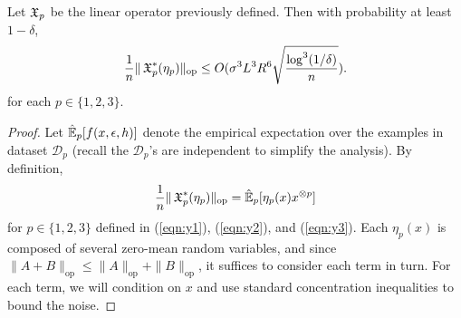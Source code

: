 \documentclass[tablecaption=bottom]{jmlr}
\newcommand\refeqn[1]{(\ref{eqn:#1})}
\newcommand\sD{\ensuremath{\mathcal{D}}}
\newcommand\op{{\textrm{op}}}
\begin{document}
\begin{lemma}
\label{lem:lowRankUpper}
Let $\operatorname{\mathfrak{X}}_p$ be the linear operator previously defined. Then with
probability at least $1-\delta$,
$$\frac1{n} \|\opX_p^*(\eta_p)\|_\op \le O(\sigma^3 L^3 R^6 \sqrt{\frac{\log^3(1/\delta)}{n}}).$$
for each $p \in \{1,2,3\}$.
\end{lemma}

\begin{proof}
Let $\hat{\operatorname{\mathbb{E}}}_p[f(x,\epsilon,h)]$ denote the empirical expectation over
the examples in dataset $\sD_p$ (recall the $\sD_p$'s are independent to
simplify the analysis).  By definition,
$$\frac1n \|\opX_p^*(\eta_p)\|_\op = \hat\E_p[\eta_p(x) x\tp{p}]$$
for $p \in \{1,2,3\}$ defined in \refeqn{y1}, \refeqn{y2}, and
\refeqn{y3}. Each $\eta_p(x)$ is composed of several zero-mean random
variables, and since $\|A + B\|_\op \le \|A\|_\op + \|B\|_\op$, it
suffices to consider each term in turn. 
For each term, we will
condition on $x$ and use standard concentration inequalities to bound
the noise. 


\end{proof}
\end{document}
